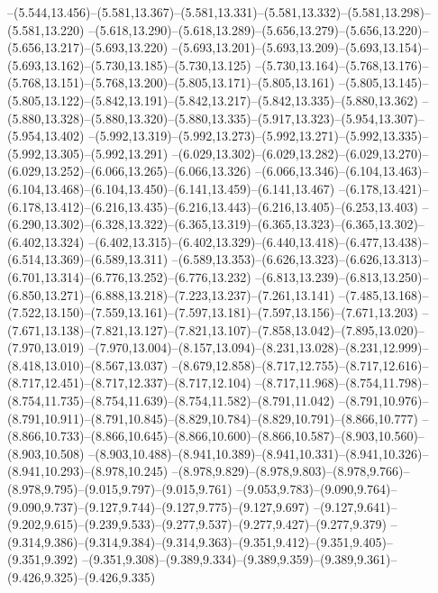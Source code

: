   --(5.544,13.456)--(5.581,13.367)--(5.581,13.331)--(5.581,13.332)--(5.581,13.298)--(5.581,13.220)%
  --(5.618,13.290)--(5.618,13.289)--(5.656,13.279)--(5.656,13.220)--(5.656,13.217)--(5.693,13.220)%
  --(5.693,13.201)--(5.693,13.209)--(5.693,13.154)--(5.693,13.162)--(5.730,13.185)--(5.730,13.125)%
  --(5.730,13.164)--(5.768,13.176)--(5.768,13.151)--(5.768,13.200)--(5.805,13.171)--(5.805,13.161)%
  --(5.805,13.145)--(5.805,13.122)--(5.842,13.191)--(5.842,13.217)--(5.842,13.335)--(5.880,13.362)%
  --(5.880,13.328)--(5.880,13.320)--(5.880,13.335)--(5.917,13.323)--(5.954,13.307)--(5.954,13.402)%
  --(5.992,13.319)--(5.992,13.273)--(5.992,13.271)--(5.992,13.335)--(5.992,13.305)--(5.992,13.291)%
  --(6.029,13.302)--(6.029,13.282)--(6.029,13.270)--(6.029,13.252)--(6.066,13.265)--(6.066,13.326)%
  --(6.066,13.346)--(6.104,13.463)--(6.104,13.468)--(6.104,13.450)--(6.141,13.459)--(6.141,13.467)%
  --(6.178,13.421)--(6.178,13.412)--(6.216,13.435)--(6.216,13.443)--(6.216,13.405)--(6.253,13.403)%
  --(6.290,13.302)--(6.328,13.322)--(6.365,13.319)--(6.365,13.323)--(6.365,13.302)--(6.402,13.324)%
  --(6.402,13.315)--(6.402,13.329)--(6.440,13.418)--(6.477,13.438)--(6.514,13.369)--(6.589,13.311)%
  --(6.589,13.353)--(6.626,13.323)--(6.626,13.313)--(6.701,13.314)--(6.776,13.252)--(6.776,13.232)%
  --(6.813,13.239)--(6.813,13.250)--(6.850,13.271)--(6.888,13.218)--(7.223,13.237)--(7.261,13.141)%
  --(7.485,13.168)--(7.522,13.150)--(7.559,13.161)--(7.597,13.181)--(7.597,13.156)--(7.671,13.203)%
  --(7.671,13.138)--(7.821,13.127)--(7.821,13.107)--(7.858,13.042)--(7.895,13.020)--(7.970,13.019)%
  --(7.970,13.004)--(8.157,13.094)--(8.231,13.028)--(8.231,12.999)--(8.418,13.010)--(8.567,13.037)%
  --(8.679,12.858)--(8.717,12.755)--(8.717,12.616)--(8.717,12.451)--(8.717,12.337)--(8.717,12.104)%
  --(8.717,11.968)--(8.754,11.798)--(8.754,11.735)--(8.754,11.639)--(8.754,11.582)--(8.791,11.042)%
  --(8.791,10.976)--(8.791,10.911)--(8.791,10.845)--(8.829,10.784)--(8.829,10.791)--(8.866,10.777)%
  --(8.866,10.733)--(8.866,10.645)--(8.866,10.600)--(8.866,10.587)--(8.903,10.560)--(8.903,10.508)%
  --(8.903,10.488)--(8.941,10.389)--(8.941,10.331)--(8.941,10.326)--(8.941,10.293)--(8.978,10.245)%
  --(8.978,9.829)--(8.978,9.803)--(8.978,9.766)--(8.978,9.795)--(9.015,9.797)--(9.015,9.761)%
  --(9.053,9.783)--(9.090,9.764)--(9.090,9.737)--(9.127,9.744)--(9.127,9.775)--(9.127,9.697)%
  --(9.127,9.641)--(9.202,9.615)--(9.239,9.533)--(9.277,9.537)--(9.277,9.427)--(9.277,9.379)%
  --(9.314,9.386)--(9.314,9.384)--(9.314,9.363)--(9.351,9.412)--(9.351,9.405)--(9.351,9.392)%
  --(9.351,9.308)--(9.389,9.334)--(9.389,9.359)--(9.389,9.361)--(9.426,9.325)--(9.426,9.335)%
